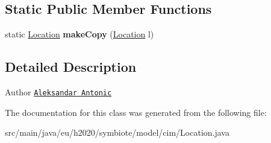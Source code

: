 \subsection*{Static Public Member Functions}
\begin{DoxyCompactItemize}
\item 
\mbox{\label{classeu_1_1h2020_1_1symbiote_1_1model_1_1cim_1_1Location_af9feb74a3ead33fd7de2c1d34e1dd434}} 
static \hyperlink{classeu_1_1h2020_1_1symbiote_1_1model_1_1cim_1_1Location}{Location} {\bfseries make\+Copy} (\hyperlink{classeu_1_1h2020_1_1symbiote_1_1model_1_1cim_1_1Location}{Location} l)
\end{DoxyCompactItemize}


\subsection{Detailed Description}
\begin{DoxyAuthor}{Author}
\href{mailto:aleksandar.antonic@fer.hr}{\tt Aleksandar Antonic} 
\end{DoxyAuthor}


The documentation for this class was generated from the following file\+:\begin{DoxyCompactItemize}
\item 
src/main/java/eu/h2020/symbiote/model/cim/Location.\+java\end{DoxyCompactItemize}
